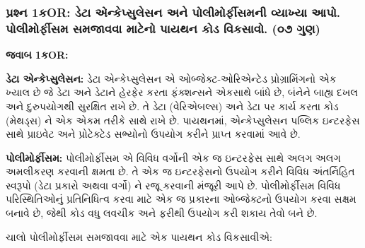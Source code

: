\hypertarget{uxaaauxab0uxab6uxaa8-1uxa95or-uxaa1uxa9f-uxa8fuxaa8uxa95uxaaauxab8uxab2uxab8uxaa8-uxa85uxaa8-uxaaauxab2uxaaeuxab0uxaabuxab8uxaaeuxaa8-uxab5uxaafuxa96uxaaf-uxa86uxaaa.-uxaaauxab2uxaaeuxab0uxaabuxab8uxaae-uxab8uxaaeuxa9cuxab5uxab5-uxaaeuxa9fuxaa8-uxaaauxaafuxaa5uxaa8-uxa95uxaa1-uxab5uxa95uxab8uxab5.-uxae6uxaed-uxa97uxaa3}{%
\subsubsection{પ્રશ્ન 1કOR: ડેટા એન્કેપ્સુલેસન અને પોલીમોર્ફીસમની વ્યાખ્યા આપો.
પોલીમોર્ફીસમ સમજાવવા માટેનો પાયથન કોડ વિકસાવો. (૦૭
ગુણ)}\label{uxaaauxab0uxab6uxaa8-1uxa95or-uxaa1uxa9f-uxa8fuxaa8uxa95uxaaauxab8uxab2uxab8uxaa8-uxa85uxaa8-uxaaauxab2uxaaeuxab0uxaabuxab8uxaaeuxaa8-uxab5uxaafuxa96uxaaf-uxa86uxaaa.-uxaaauxab2uxaaeuxab0uxaabuxab8uxaae-uxab8uxaaeuxa9cuxab5uxab5-uxaaeuxa9fuxaa8-uxaaauxaafuxaa5uxaa8-uxa95uxaa1-uxab5uxa95uxab8uxab5.-uxae6uxaed-uxa97uxaa3}}

\textbf{જવાબ 1કOR:}

\textbf{ડેટા એન્કેપ્સુલેસન:} ડેટા એન્કેપ્સુલેસન એ ઓબ્જેક્ટ-ઓરિએન્ટેડ પ્રોગ્રામિંગનો એક ખ્યાલ
છે જે ડેટા અને ડેટાને હેરફેર કરતા ફંક્શન્સને એકસાથે બાંધે છે, બંનેને બાહ્ય દખલ અને દુરુપયોગથી
સુરક્ષિત રાખે છે. તે ડેટા (વેરિએબલ્સ) અને ડેટા પર કાર્ય કરતા કોડ (મેથડ્સ) ને એક એકમ
તરીકે સાથે રાખે છે. પાયથનમાં, એન્કેપ્સુલેસન પબ્લિક ઇન્ટરફેસ સાથે પ્રાઇવેટ અને પ્રોટેક્ટેડ
સભ્યોનો ઉપયોગ કરીને પ્રાપ્ત કરવામાં આવે છે.

\textbf{પોલીમોર્ફીસમ:} પોલીમોર્ફીસમ એ વિવિધ વર્ગોની એક જ ઇન્ટરફેસ સાથે અલગ અલગ
અમલીકરણ કરવાની ક્ષમતા છે. તે એક જ ઇન્ટરફેસનો ઉપયોગ કરીને વિવિધ અંતર્નિહિત સ્વરૂપો
(ડેટા પ્રકારો અથવા વર્ગો) ને રજૂ કરવાની મંજૂરી આપે છે. પોલીમોર્ફીસમ વિવિધ
પરિસ્થિતિઓનું પ્રતિનિધિત્વ કરવા માટે એક જ પ્રકારના ઓબ્જેક્ટનો ઉપયોગ કરવા સક્ષમ બનાવે
છે, જેથી કોડ વધુ લવચીક અને ફરીથી ઉપયોગ કરી શકાય તેવો બને છે.

ચાલો પોલીમોર્ફીસમ સમજાવવા માટે એક પાયથન કોડ વિકસાવીએ:

